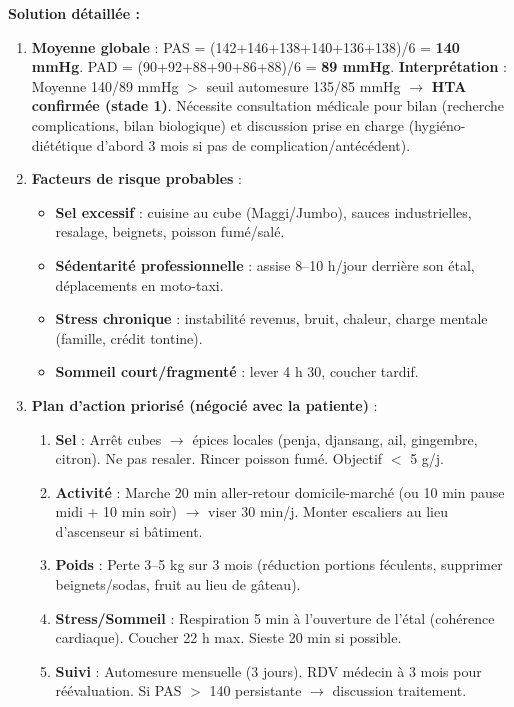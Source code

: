 \documentclass[11pt]{article}
\begin{document}
\begin{exoresolu}
\tcblower
\textbf{Solution détaillée :}
\begin{enumerate}
\item \textbf{Moyenne globale} : PAS = (142+146+138+140+136+138)/6 = \textbf{140 mmHg}. PAD = (90+92+88+90+86+88)/6 = \textbf{89 mmHg}.
\textbf{Interprétation} : Moyenne 140/89 mmHg $>$ seuil automesure 135/85 mmHg $\rightarrow$ \textbf{HTA confirmée (stade 1)}. Nécessite consultation médicale pour bilan (recherche complications, bilan biologique) et discussion prise en charge (hygiéno-diététique d'abord 3 mois si pas de complication/antécédent).
\item \textbf{Facteurs de risque probables} :
    \begin{itemize}
    \item \textbf{Sel excessif} : cuisine au cube (Maggi/Jumbo), sauces industrielles, resalage, beignets, poisson fumé/salé.
    \item \textbf{Sédentarité professionnelle} : assise 8--10 h/jour derrière son étal, déplacements en moto-taxi.
    \item \textbf{Stress chronique} : instabilité revenus, bruit, chaleur, charge mentale (famille, crédit tontine).
    \item \textbf{Sommeil court/fragmenté} : lever 4 h 30, coucher tardif.
    \end{itemize}
\item \textbf{Plan d'action priorisé (négocié avec la patiente)} :
    \begin{enumerate}
    \item \textbf{Sel} : Arrêt cubes $\rightarrow$ épices locales (penja, djansang, ail, gingembre, citron). Ne pas resaler. Rincer poisson fumé. Objectif $<$ 5 g/j.
    \item \textbf{Activité} : Marche 20 min aller-retour domicile-marché (ou 10 min pause midi + 10 min soir) $\rightarrow$ viser 30 min/j. Monter escaliers au lieu d'ascenseur si bâtiment.
    \item \textbf{Poids} : Perte 3--5 kg sur 3 mois (réduction portions féculents, supprimer beignets/sodas, fruit au lieu de gâteau).
    \item \textbf{Stress/Sommeil} : Respiration 5 min à l'ouverture de l'étal (cohérence cardiaque). Coucher 22 h max. Sieste 20 min si possible.
    \item \textbf{Suivi} : Automesure mensuelle (3 jours). RDV médecin à 3 mois pour réévaluation. Si PAS $>$ 140 persistante $\rightarrow$ discussion traitement.
    \end{enumerate}
\end{enumerate}
\end{exoresolu}
\end{document}

